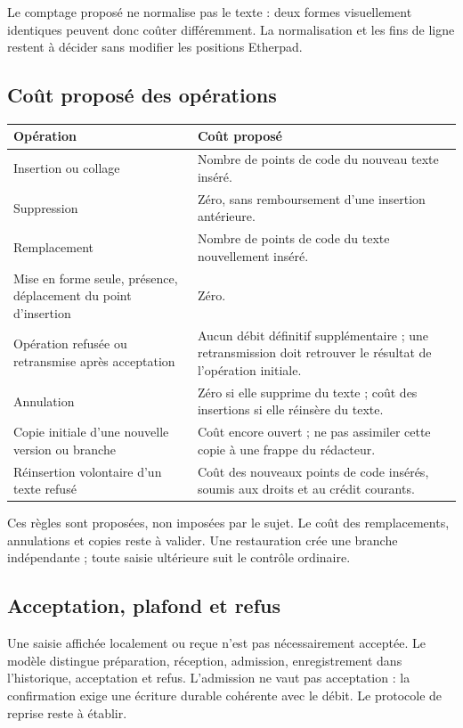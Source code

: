Le comptage proposé ne normalise pas le texte : deux formes visuellement identiques peuvent donc coûter différemment. La normalisation et les fins de ligne restent à décider sans modifier les positions Etherpad.

\subsection{Coût proposé des opérations}

\begin{center}
\begin{tabularx}{\linewidth}{@{}L{43mm}Y@{}}
\toprule
Opération & Coût proposé \\
\midrule
Insertion ou collage & Nombre de points de code du nouveau texte inséré. \\
Suppression & Zéro, sans remboursement d'une insertion antérieure. \\
Remplacement & Nombre de points de code du texte nouvellement inséré. \\
Mise en forme seule, présence, déplacement du point d'insertion & Zéro. \\
Opération refusée ou retransmise après acceptation & Aucun débit définitif supplémentaire ; une retransmission doit retrouver le résultat de l'opération initiale. \\
Annulation & Zéro si elle supprime du texte ; coût des insertions si elle réinsère du texte. \\
Copie initiale d'une nouvelle version ou branche & Coût encore ouvert ; ne pas assimiler cette copie à une frappe du rédacteur. \\
Réinsertion volontaire d'un texte refusé & Coût des nouveaux points de code insérés, soumis aux droits et au crédit courants. \\
\bottomrule
\end{tabularx}
\end{center}

Ces règles sont proposées, non imposées par le sujet. Le coût des remplacements, annulations et copies reste à valider. Une restauration crée une branche indépendante ; toute saisie ultérieure suit le contrôle ordinaire.

\subsection{Acceptation, plafond et refus}

Une saisie affichée localement ou reçue n'est pas nécessairement acceptée. Le modèle distingue préparation, réception, admission, enregistrement dans l'historique, acceptation et refus. L'admission ne vaut pas acceptation : la confirmation exige une écriture durable cohérente avec le débit. Le protocole de reprise reste à établir.

